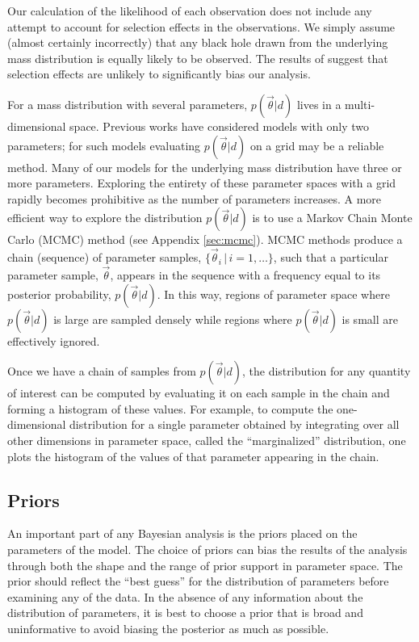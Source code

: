 \documentclass[preprint]{aastex}
\newcommand{\vtheta}{\vec{\theta}}
\begin{document}
Our calculation of the likelihood of each observation does not include
any attempt to account for selection effects in the observations.  We
simply assume (almost certainly incorrectly) that any black hole drawn
from the underlying mass distribution is equally likely to be
observed.  The results of \citet{Ozel2010} suggest that selection
effects are unlikely to significantly bias our analysis.

For a mass distribution with several parameters, $p(\vtheta | d)$
lives in a multi-dimensional space.  Previous works
\citep{Ozel2010,Bailyn1998} have considered models with only two
parameters; for such models evaluating $p(\vtheta|d)$ on a grid may be
a reliable method.  Many of our models for the underlying mass
distribution have three or more parameters.  Exploring the entirety of
these parameter spaces with a grid rapidly becomes prohibitive as the
number of parameters increases.  A more efficient way to explore the
distribution $p(\vtheta | d)$ is to use a Markov Chain Monte Carlo
(MCMC) method (see Appendix \ref{sec:mcmc}).  MCMC methods produce a
chain (sequence) of parameter samples, $\{ \vtheta_i \, | \, i = 1,
\ldots \}$, such that a particular parameter sample, $\vtheta$,
appears in the sequence with a frequency equal to its posterior
probability, $p(\vtheta|d)$.  In this way, regions of parameter space
where $p(\vtheta|d)$ is large are sampled densely while regions where
$p(\vtheta|d)$ is small are effectively ignored.

Once we have a chain of samples from $p(\vtheta|d)$, the distribution
for any quantity of interest can be computed by evaluating it on each
sample in the chain and forming a histogram of these values.  For
example, to compute the one-dimensional distribution for a single
parameter obtained by integrating over all other dimensions in
parameter space, called the ``marginalized'' distribution, one plots
the histogram of the values of that parameter appearing in the chain.

\subsection{Priors}
\label{sec:priors}

An important part of any Bayesian analysis is the priors placed on the
parameters of the model.  The choice of priors can bias the results of
the analysis through both the shape and the range of prior support in
parameter space.  The prior should reflect the ``best guess'' for the
distribution of parameters before examining any of the data.  In the
absence of any information about the distribution of parameters, it is
best to choose a prior that is broad and uninformative to avoid biasing
the posterior as much as possible.
\end{document}
